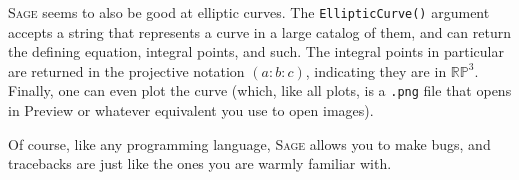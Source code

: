\textsc{Sage} seems to also be good at elliptic curves. The \texttt{EllipticCurve()} argument accepts a string that represents a curve in a large catalog of them, and can return the defining equation, integral points, and such. The integral points in particular are returned in the projective notation $(a:b:c)$, indicating they are in $\mathbb{RP}^3$. Finally, one can even plot the curve (which, like all plots, is a \texttt{.png} file that opens in Preview or whatever equivalent you use to open images).

Of course, like any programming language, \textsc{Sage} allows you to make bugs, and tracebacks are just like the ones you are warmly familiar with.
